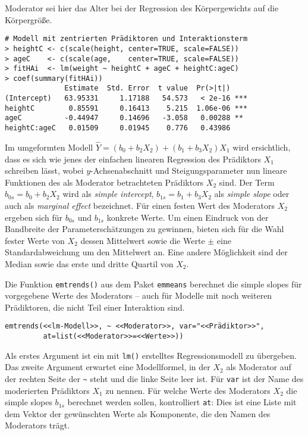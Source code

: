 Moderator sei hier das Alter bei der Regression des Körpergewichts auf die Körpergröße.
\begin{lstlisting}
# Modell mit zentrierten Prädiktoren und Interaktionsterm
> heightC <- c(scale(height, center=TRUE, scale=FALSE))
> ageC    <- c(scale(age,    center=TRUE, scale=FALSE))
> fitHAi  <- lm(weight ~ heightC + ageC + heightC:ageC)
> coef(summary(fitHAi))
              Estimate  Std. Error  t value  Pr(>|t|)
(Intercept)   63.95331     1.17188   54.573   < 2e-16 ***
heightC        0.85591     0.16413    5.215  1.06e-06 ***
ageC          -0.44947     0.14696   -3.058   0.00288 **
heightC:ageC   0.01509     0.01945    0.776   0.43986
\end{lstlisting}

Im umgeformten Modell $\hat{Y} = (b_{0} + b_{2} X_{2}) + (b_{1} + b_{3} X_{2}) X_{1}$ wird ersichtlich, dass es sich wie jenes der einfachen linearen Regression des Prädiktors $X_{1}$ schreiben lässt, wobei $y$-Achsenabschnitt und Steigungsparameter nun lineare Funktionen des als Moderator betrachteten Prädiktors $X_{2}$ sind. Der Term $b_{0s} = b_{0} + b_{2} X_{2}$ wird als \emph{simple intercept}, $b_{1s} = b_{1} + b_{3} X_{2}$ als \emph{simple slope} oder auch als \emph{marginal effect} bezeichnet. Für einen festen Wert des Moderators $X_{2}$ ergeben sich für $b_{0s}$ und $b_{1s}$ konkrete Werte. Um einen Eindruck von der Bandbreite der Parameterschätzungen zu gewinnen, bieten sich für die Wahl fester Werte von $X_{2}$ dessen Mittelwert sowie die Werte $\pm$ eine Standardabweichung um den Mittelwert an. Eine andere Möglichkeit sind der Median sowie das erste und dritte Quartil von $X_{2}$.

Die Funktion \lstinline!emtrends()! aus dem Paket \lstinline!emmeans! \cite{Lenth2019} berechnet die simple slopes für vorgegebene Werte des Moderators -- auch für Modelle mit noch weiteren Prädiktoren, die nicht Teil einer Interaktion sind.
\begin{lstlisting}
emtrends(<<lm-Modell>>, ~ <<Moderator>>, var="<<Prädiktor>>",
         at=list(<<Moderator>>=<<Werte>>))
\end{lstlisting}

Als erstes Argument ist ein mit \lstinline!lm()! erstelltes Regressionsmodell zu übergeben. Das zweite Argument erwartet eine Modellformel, in der $X_{2}$ als Moderator auf der rechten Seite der \lstinline!~! steht und die linke Seite leer ist. Für \lstinline!var! ist der Name des moderierten Prädiktors $X_{1}$ zu nennen. Für welche Werte des Moderators $X_{2}$ die simple slopes $b_{1s}$ berechnet werden sollen, kontrolliert \lstinline!at!: Dies ist eine Liste mit dem Vektor der gewünschten Werte als Komponente, die den Namen des Moderators trägt.

